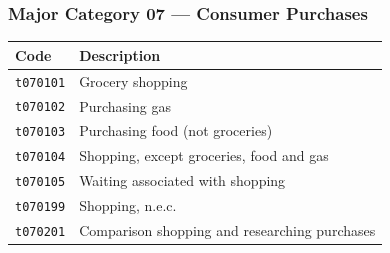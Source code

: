 \documentclass[11pt, a4paper]{article}
\begin{document}
\subsubsection*{Major Category 07 --- Consumer Purchases}
\begin{longtable}{L{3cm} L{13cm}}
\toprule \textbf{Code} & \textbf{Description} \\ \midrule \endhead
\bottomrule \endfoot
\texttt{t070101} & Grocery shopping \\
 \texttt{t070102} & Purchasing gas \\
\texttt{t070103} & Purchasing food (not groceries) \\
 \texttt{t070104} & Shopping, except groceries, food and gas \\
\texttt{t070105} & Waiting associated with shopping \\
 \texttt{t070199} & Shopping, n.e.c. \\
\texttt{t070201} & Comparison shopping and researching purchases \\
\end{longtable}
\end{document}
